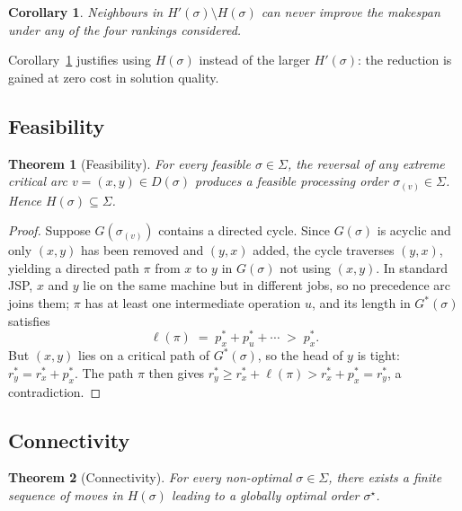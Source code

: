 \documentclass[preprint,12pt]{elsarticle}
\newtheorem{theorem}{Theorem}
\newtheorem{corollary}{Corollary}
\begin{document}
\medskip

\begin{corollary}
\label{cor1}
Neighbours in $H'(\sigma) \setminus H(\sigma)$ can never improve the makespan under any of the four rankings considered.
\end{corollary}

Corollary~\ref{cor1} justifies using $H(\sigma)$ instead of the larger $H'(\sigma)$: the reduction is gained at zero cost in solution quality.

\subsection{Feasibility}
\label{sec:H-feasibility}

\begin{theorem}[Feasibility]
\label{thm1}
For every feasible $\sigma \in \Sigma$, the reversal of any extreme critical arc $v = (x,y) \in D(\sigma)$ produces a feasible processing order $\sigma_{(v)} \in \Sigma$. Hence $H(\sigma) \subseteq \Sigma$.
\end{theorem}

\begin{proof}
Suppose $G(\sigma_{(v)})$ contains a directed cycle. Since $G(\sigma)$ is acyclic and only $(x,y)$ has been removed and $(y,x)$ added, the cycle traverses $(y,x)$, yielding a directed path $\pi$ from $x$ to $y$ in $G(\sigma)$ not using $(x,y)$. In standard JSP, $x$ and $y$ lie on the same machine but in different jobs, so no precedence arc joins them; $\pi$ has at least one intermediate operation $u$, and its length in $G^*(\sigma)$ satisfies
\[
  \ell(\pi) \;=\; p_x^* + p_u^* + \cdots \;>\; p_x^*.
\]
But $(x,y)$ lies on a critical path of $G^*(\sigma)$, so the head of $y$ is tight: $r_y^*=r_x^*+p_x^*$. The path $\pi$ then gives $r_y^*\ge r_x^*+\ell(\pi)>r_x^*+p_x^*=r_y^*$, a contradiction.
\end{proof}

\subsection{Connectivity}
\label{sec:H-connectivity}

\begin{theorem}[Connectivity]
\label{thm2}
For every non-optimal $\sigma \in \Sigma$, there exists a finite sequence of moves in $H(\sigma)$ leading to a globally optimal order $\sigma^{\star}$.
\end{theorem}
\end{document}
